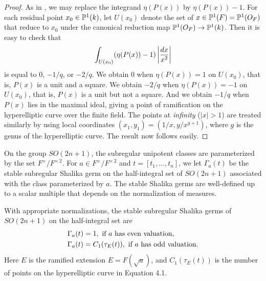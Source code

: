 \documentclass{amsart}
\begin{document}
\begin{proof}  As in \cite{H5,2.2}, we may replace the integrand $\eta(P(x))$ by 
$\eta(P(x))-1$.  For each residual point $x_0\in{\Bbb P}^1(k)$, let 
$U(x_0)$ denote the set of $x\in {\Bbb P}^1(F) = {\Bbb P}^1(O_F)$ that reduce to
$x_0$ under the canonical reduction map ${\Bbb P}^1(O_F)\to {\Bbb P}^1(k)$.  Then it is
easy to check that
$$\int_{U(x_0)} (\eta(P(x)) - 1) \left|{dx\over x^2}\right|$$
is equal to $0$, $-1/q$, or $-2/q$.  We obtain $0$ when
$\eta(P(x))=1$ on $U(x_0)$, that is, $P(x)$ is a unit and a square.
We obtain $-2/q$ when $\eta(P(x))=-1$ on $U(x_0)$, that is, $P(x)$ is
a unit but not a square.  And we obtain $-1/q$ when $P(x)$ lies in the
maximal ideal, giving a point of ramification on the hyperelliptic
curve over the finite field.  The points at {\it infinity} ($|x|>1$)
 are treated similarly
by using local coordinates $(x_1,y_1)=(1/x,y/x^{g+1})$, where $g$ is the genus
of the hyperelliptic curve.  The result now follows easily.\end{proof}

On the group $SO(2n+1)$, the subregular unipotent classes are
parameterized by the set $F^\times/F^{\times\,2}$.  For $a\in F^\times/
F^{\times\,2}$ and $t=[t_1,\ldots,t_n]$,
we let $\Gamma_a(t)$ be the stable
subregular
Shalika germ on the half-integral set of $SO(2n+1)$ associated
with the class parameterized by $a$.  The stable
Shalika germs are well-defined up to a scalar multiple that depends
on the normalization of measures.

  With appropriate normalizations, the stable
subregular Shalika germs of $SO(2n+1)$ on the half-integral set
are
\begin{align*}
\Gamma_a(t) &= 1,\ \hbox{if $a$ has even valuation,}\\
\Gamma_a(t) &= C_1(\tau_E(t)),\ \hbox{if $a$ has odd valuation.}
\end{align*}
Here 
$E$ is the ramified extension 
$E=  F(\sqrt{a})$, and
$C_1(\tau_E(t))$ is the number of points on the hyperelliptic
curve in Equation 4.1.
\endproclaim
\end{document}
